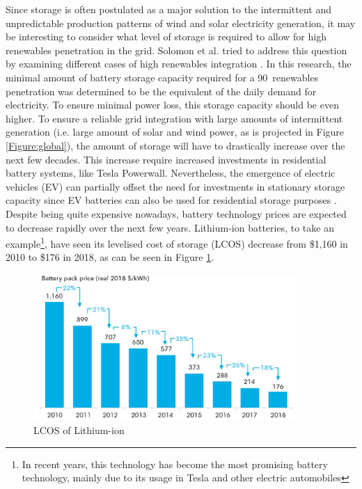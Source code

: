 \newline \newline \noindent
Since storage is often postulated as a major solution to the intermittent and unpredictable production patterns of wind and solar electricity generation, it may be interesting to consider what level of storage is required to allow for high renewables penetration in the grid. Solomon et al. tried to address this question by examining different cases of high renewables integration \cite{penetration}. In this research, the minimal amount of battery storage capacity required for a 90\  renewables penetration was determined to be the equivalent of the daily demand for electricity. To ensure minimal power loss, this storage capacity should be even higher. To ensure a reliable grid integration with large amounts of intermittent generation (i.e. large amount of solar and wind power, as is projected in Figure \ref{Figure:global}), the amount of storage will have to drastically increase over the next few decades. This increase require increased investments in residential battery systems, like Tesla Powerwall. Nevertheless, the emergence of electric vehicles (EV) can partially offset the need for investments in stationary storage capacity since EV batteries can also be used for residential storage purposes \cite{EV1,EV2}. 
\newline \newline \noindent
Despite being quite expensive nowadays, battery technology prices are expected to decrease rapidly over the next few years. Lithium-ion batteries, to take an example\footnote{In recent years, this technology has become the most promising battery technology, mainly due to its usage in Tesla and other electric automobiles}, have seen its levelised cost of storage (LCOS) decrease from \$1,160 in 2010 to \$176 in 2018, as can be seen in Figure \ref{Figure:bloom}.
\newline 
\begin{figure}[h!]
\centering
\includegraphics[width=10cm]{LCOS.PNG}
\caption[LCOS of Lithium-ion]{LCOS of Lithium-ion \cite{bloomberg}}
\label{Figure:bloom}
\end{figure}
